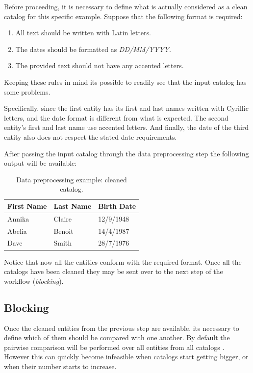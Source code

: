 \documentclass[epsfig,a4paper,11pt,titlepage,twoside,openany]{book}
\begin{document}
Before proceeding, it is necessary to define what is actually considered as a clean catalog for this
specific example. Suppose that the following format is required:

\begin{enumerate}
\item All text should be written with Latin letters.
\item The dates should be formatted as \textit{DD/MM/YYYY}.
\item The provided text should not have any accented letters.
\end{enumerate}

Keeping these rules in mind its possible to readily see that the input catalog has some
problems. 

Specifically, since the first entity has its first and last names written
with Cyrillic letters, and the date format is different from what is expected. The
second entity's first and last name use accented letters. And finally, the date of
the third entity also does not respect the stated date requirements.

After passing the input catalog through the data preprocessing step the following output will be available:

\begin{table}[H]
  \centering

  \begin{tabular}{l|l|l}
    First Name & Last Name & Birth Date \\ \hline
    Annika     & Claire    & 12/9/1948  \\
    Abelia     & Benoit    & 14/4/1987  \\
    Dave       & Smith     & 28/7/1976   
  \end{tabular}
  
  \caption{Data preprocessing example: cleaned catalog.}
  \label{tab:data-prepr-ex-cleaned}
\end{table}

Notice that now all the entities conform with the required format. Once all the
catalogs have been cleaned they may be sent over to the next step of the workflow
(\textit{blocking}).



\subsection{Blocking}
\label{sec:rl-workflow-blocking}

Once the cleaned entities from the previous step are available, its necessary to define which
of them should be compared with one another. By default the pairwise comparison will be performed over all entities from all catalogs . However this can quickly
become infeasible when catalogs start getting bigger, or when their number starts to increase. 
\end{document}
